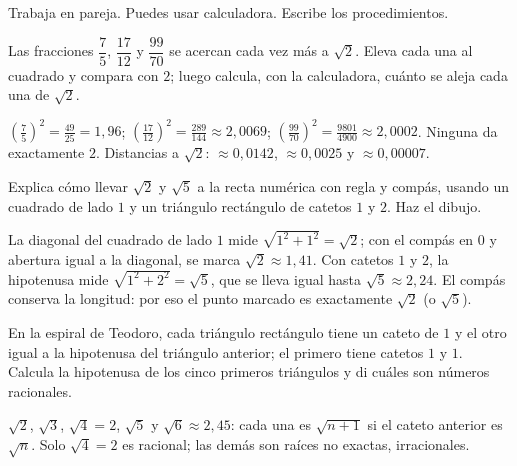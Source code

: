 \documentclass[11pt]{article}
\begin{document}
\encabezado

\begin{instrucciones}
Trabaja en pareja. Puedes usar calculadora. Escribe los procedimientos.
\end{instrucciones}

\begin{preguntas}

\pregunta[1] Las fracciones $\dfrac{7}{5}$, $\dfrac{17}{12}$ y $\dfrac{99}{70}$ se acercan
cada vez más a $\sqrt{2}$. Eleva cada una al cuadrado y compara con $2$; luego calcula, con la
calculadora, cuánto se aleja cada una de $\sqrt{2}$.
\espacio{2.4cm}
\begin{solucion}
$\left(\frac{7}{5}\right)^2 = \frac{49}{25} = 1{,}96$;
$\left(\frac{17}{12}\right)^2 = \frac{289}{144} \approx 2{,}0069$;
$\left(\frac{99}{70}\right)^2 = \frac{9801}{4900} \approx 2{,}0002$. Ninguna da exactamente
$2$. Distancias a $\sqrt{2}$: $\approx 0{,}0142$, $\approx 0{,}0025$ y $\approx 0{,}00007$.
\end{solucion}

\pregunta[1] Explica cómo llevar $\sqrt{2}$ y $\sqrt{5}$ a la recta numérica con regla y
compás, usando un cuadrado de lado $1$ y un triángulo rectángulo de catetos $1$ y $2$. Haz el
dibujo.
\espacio{3.2cm}
\begin{solucion}
La diagonal del cuadrado de lado $1$ mide $\sqrt{1^2 + 1^2} = \sqrt{2}$; con el compás en $0$
y abertura igual a la diagonal, se marca $\sqrt{2} \approx 1{,}41$. Con catetos $1$ y $2$, la
hipotenusa mide $\sqrt{1^2 + 2^2} = \sqrt{5}$, que se lleva igual hasta
$\sqrt{5} \approx 2{,}24$. El compás conserva la longitud: por eso el punto marcado es
exactamente $\sqrt{2}$ (o $\sqrt{5}$).
\end{solucion}

\pregunta[1] En la espiral de Teodoro, cada triángulo rectángulo tiene un cateto de $1$ y el
otro igual a la hipotenusa del triángulo anterior; el primero tiene catetos $1$ y $1$. Calcula
la hipotenusa de los cinco primeros triángulos y di cuáles son números racionales.
\espacio{2.4cm}
\begin{solucion}
$\sqrt{2}$, $\sqrt{3}$, $\sqrt{4} = 2$, $\sqrt{5}$ y $\sqrt{6} \approx 2{,}45$: cada una es
$\sqrt{n + 1}$ si el cateto anterior es $\sqrt{n}$. Solo $\sqrt{4} = 2$ es racional; las demás
son raíces no exactas, irracionales.
\end{solucion}


\end{preguntas}
\end{document}
